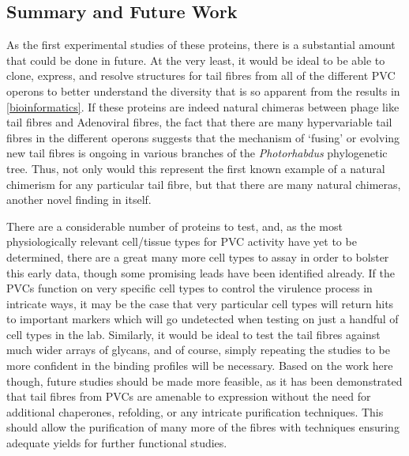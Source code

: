\subsection{Summary and Future Work}
As the first experimental studies of these proteins, there is a substantial amount that could be done in future. At the very least, it would be ideal to be able to clone, express, and resolve structures for tail fibres from all of the different PVC operons to better understand the diversity that is so apparent from the results in \vref{bioinformatics}. If these proteins are indeed natural chimeras between phage like tail fibres and Adenoviral fibres, the fact that there are many hypervariable tail fibres in the different operons suggests that the mechanism of `fusing' or evolving new tail fibres is ongoing in various branches of the \emph{Photorhabdus} phylogenetic tree. Thus, not only would this represent the first known example of a natural chimerism for any particular tail fibre, but that there are many natural chimeras, another novel finding in itself.

There are a considerable number of proteins to test, and, as the most physiologically relevant cell/tissue types for PVC activity have yet to be determined, there are a great many more cell types to assay in order to bolster this early data, though some promising leads have been identified already. If the PVCs function on very specific cell types to control the virulence process in intricate ways, it may be the case that very particular cell types will return hits to important markers which will go undetected when testing on just a handful of cell types in the lab. Similarly, it would be ideal to test the tail fibres against much wider arrays of glycans, and of course, simply repeating the studies to be more confident in the binding profiles will be necessary. Based on the work here though, future studies should be made more feasible, as it has been demonstrated that tail fibres from PVCs are amenable to expression without the need for additional chaperones, refolding, or any intricate purification techniques. This should allow the purification of many more of the fibres with techniques ensuring adequate yields for further functional studies.


